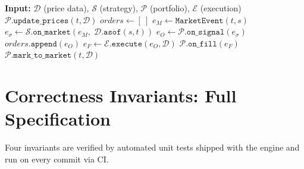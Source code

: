 \documentclass[12pt]{article}
\begin{document}
\begin{algorithm}[H]
\caption{Event-Driven Backtest Loop (one trading day)}
\begin{algorithmic}[1]
\State \textbf{Input:} $\mathcal{D}$ (price data), $\mathcal{S}$
  (strategy), $\mathcal{P}$ (portfolio), $\mathcal{E}$ (execution)
  \State $\mathcal{P}.\texttt{update\_prices}(t, \mathcal{D})$
  \State $\textit{orders} \leftarrow [\ ]$
    \State $e_M \leftarrow \texttt{MarketEvent}(t, s)$
    \State $e_\sigma \leftarrow
           \mathcal{S}.\texttt{on\_market}(e_M,\;
           \mathcal{D}.\texttt{asof}(s,t))$
      \State $e_O \leftarrow \mathcal{P}.\texttt{on\_signal}(e_\sigma)$
        \State $\textit{orders}.\texttt{append}(e_O)$
      \EndIf
    \EndIf
  \EndFor
  \State {}
    \State $e_F \leftarrow \mathcal{E}.\texttt{execute}(e_O,\mathcal{D})$
      \State $\mathcal{P}.\texttt{on\_fill}(e_F)$
    \EndIf
  \EndFor
  \State $\mathcal{P}.\texttt{mark\_to\_market}(t, \mathcal{D})$
  \State {}
\EndFor
\end{algorithmic}
\end{algorithm}

\section{Correctness Invariants: Full Specification}
\label{app:invariants}

Four invariants are verified by automated unit tests shipped with the
engine and run on every commit via CI.
\end{document}
